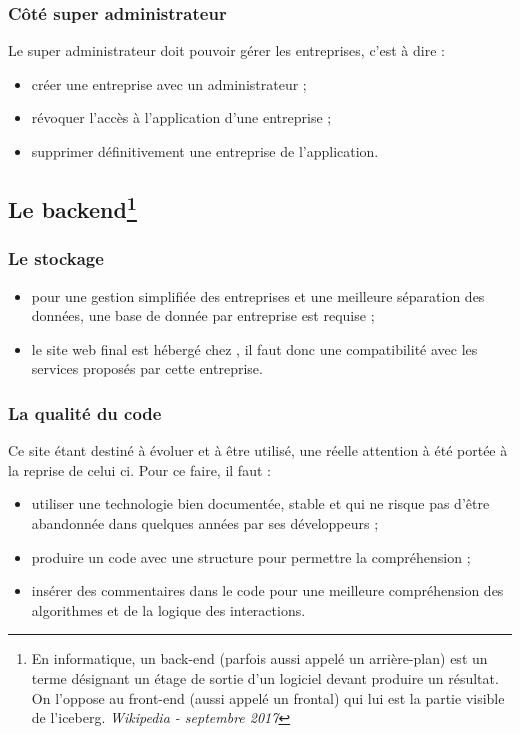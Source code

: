 \documentclass[a4paper, 11pt]{report}
\begin{document}
        \subsubsection{Côté super administrateur}
        Le super administrateur doit pouvoir gérer les entreprises, c'est à dire :
        \begin{itemize}
            \item créer une entreprise avec un administrateur ;
            \item révoquer l'accès à l'application d'une entreprise ;
            \item supprimer définitivement une entreprise de l'application.
        \end{itemize}
    \subsection[Le backend]{Le backend\footnote{En informatique, un back-end (parfois aussi appelé un arrière-plan) est un terme désignant un étage de sortie d'un logiciel devant produire un résultat. On l'oppose au front-end (aussi appelé un frontal) qui lui est la partie visible de l'iceberg. \textit{Wikipedia - septembre 2017}}}
        \subsubsection{Le stockage}
        \begin{itemize}
            \item pour une gestion simplifiée des entreprises et une meilleure séparation des données, une base de donnée par entreprise est requise ;
            \item  le site web final est hébergé chez \oswitch, il faut donc une compatibilité avec les services proposés par cette entreprise.
        \end{itemize}

        \subsubsection{La qualité du code}
        Ce site étant destiné à évoluer et à être utilisé, une réelle attention à été portée à la reprise de celui ci. Pour ce faire, il faut :
        \begin{itemize}
            \item utiliser une technologie bien documentée, stable et qui ne risque pas d'être abandonnée dans quelques années par ses développeurs ;
            \item produire un code avec une structure pour permettre la compréhension ;
            \item insérer des commentaires dans le code pour une meilleure compréhension des algorithmes et de la logique des interactions.
        \end{itemize}
\end{document}
